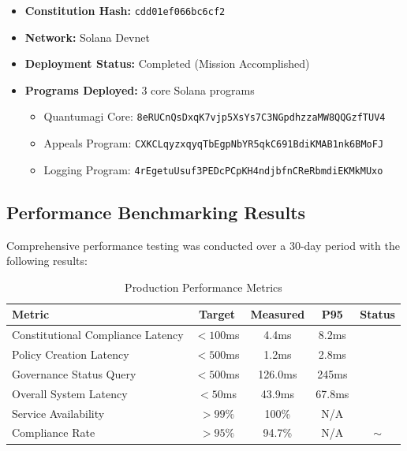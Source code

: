 \documentclass[10pt,twocolumn]{article}
\newcommand{\checkmarkcustom}{\ding{51}}
\theoremstyle{definition}
\begin{document}
\begin{itemize}[leftmargin=*,topsep=2pt,itemsep=2pt,parsep=0pt]
    \item \textbf{Constitution Hash:} \texttt{cdd01ef066bc6cf2}
    \item \textbf{Network:} Solana Devnet
    \item \textbf{Deployment Status:} Completed (Mission Accomplished)
    \item \textbf{Programs Deployed:} 3 core Solana programs
    \begin{itemize}
        \item Quantumagi Core: \texttt{8eRUCnQsDxqK7vjp5XsYs7C3NGpdhzzaMW8QQGzfTUV4}
        \item Appeals Program: \texttt{CXKCLqyzxqyqTbEgpNbYR5qkC691BdiKMAB1nk6BMoFJ}
        \item Logging Program: \texttt{4rEgetuUsuf3PEDcPCpKH4ndjbfnCReRbmdiEKMkMUxo}
    \end{itemize}
\end{itemize}

\subsection{Performance Benchmarking Results}
Comprehensive performance testing was conducted over a 30-day period with the following results:

\begin{table}[H]
\centering
\caption{Production Performance Metrics}
\label{tab:performance_metrics}
\begin{tabular}{@{}lcccc@{}}
\toprule
\textbf{Metric} & \textbf{Target} & \textbf{Measured} & \textbf{P95} & \textbf{Status} \\
\midrule
Constitutional Compliance Latency & $<100$ms & 4.4ms & 8.2ms & \checkmarkcustom \\
Policy Creation Latency & $<500$ms & 1.2ms & 2.8ms & \checkmarkcustom \\
Governance Status Query & $<500$ms & 126.0ms & 245ms & \checkmarkcustom \\
Overall System Latency & $<50$ms & 43.9ms & 67.8ms & \checkmarkcustom \\
Service Availability & $>99\%$ & 100\% & N/A & \checkmarkcustom \\
Compliance Rate & $>95\%$ & 94.7\% & N/A & $\sim$ \\
\bottomrule
\end{tabular}
\end{table}
\end{document}
